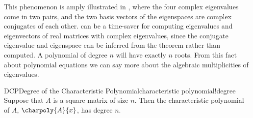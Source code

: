 %
This phenomenon is amply illustrated in , where the four complex eigenvalues come in two pairs, and the two basis vectors of the eigenspaces are complex conjugates of each other.   can be a time-saver for computing eigenvalues and eigenvectors of real matrices with complex eigenvalues, since the conjugate eigenvalue and eigenspace can be inferred from the theorem rather than computed.
%
%
A polynomial of degree $n$ will have exactly $n$ roots.  From this fact about polynomial equations we can say more about the algebraic multiplicities of eigenvalues.
%
\begin{theorem}{DCP}{Degree of the Characteristic Polynomial}{characteristic polynomial!degree}
Suppose that $A$ is a square matrix of size $n$.  Then the characteristic polynomial of $A$, $\charpoly{A}{x}$, has degree $n$.
\end{theorem}
%
